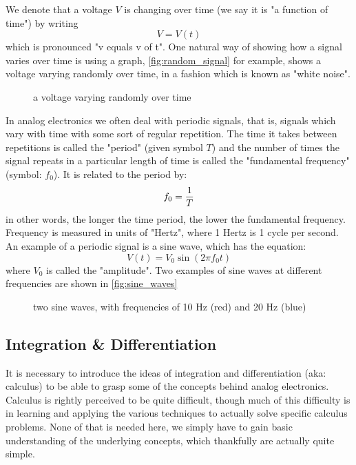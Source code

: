 \documentclass{memoir}
\begin{document}
	We denote that a voltage $V$ is changing over time (we say it is "a function of time") by writing 
	\begin{equation}
		V=V\left(t\right)
	\end{equation}
	which is pronounced "v equals v of t". One natural way of showing how a signal varies over time is using a graph, \autoref{fig:random_signal} for example, shows a voltage varying randomly over time, in a fashion which is known as "white noise".
	\begin{figure}
		\caption{\label{fig:random_signal}a voltage varying randomly over time}
	\end{figure}
	
	In analog electronics we often deal with periodic signals, that is, signals which vary with time with some sort of regular repetition. The time it takes between repetitions is called the "period" (given symbol $T$) and the number of times the signal repeats in a particular length of time is called the "fundamental frequency" (symbol: $f_0$). It is related to the period by:
	\begin{equation}
		f_0 = {1 \over T }
	\end{equation}
	in other words, the longer the time period, the lower the fundamental frequency. Frequency is measured in units of "Hertz", where 1 Hertz is 1 cycle per second. An example of a periodic signal is a sine wave, which has the equation:
	\begin{equation}
		V\left(t\right) = V_0 \sin\left(2 \pi f_0  t\right)
	\end{equation} 
	where $V_0$ is called the "amplitude". Two examples of sine waves at different frequencies are shown in \autoref{fig:sine_waves}
	
	\begin{figure}
		\caption{\label{fig:sine_waves}two sine waves, with frequencies of 10 Hz (red) and 20 Hz (blue)}
	\end{figure}
	
	\subsection{Integration \& Differentiation}
	It is necessary to introduce the ideas of integration and differentiation (aka: calculus) to be able to grasp some of the concepts behind analog electronics. Calculus is rightly perceived to be quite difficult, though much of this difficulty is in learning and applying the various techniques to actually solve specific calculus problems. None of that is needed here, we simply have to gain basic understanding of the underlying concepts, which thankfully are actually quite simple. 
\end{document}
